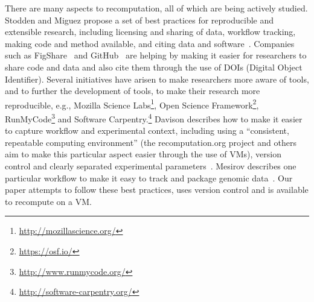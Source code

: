 There are many aspects to recomputation, all of which are being actively
studied. Stodden and Miguez propose a set of best practices for reproducible and
extensible research, including licensing and sharing of data, workflow tracking,
making code and method available, and citing data and
software~\cite{stodden:practices}. Companies such as
FigShare~\cite{figshare:citable} and GitHub~\cite{github:citable} are helping by
making it easier for researchers to share code and data and also cite them
through the use of DOIs (Digital Object Identifier). Several initiatives have
arisen to make researchers more aware of tools, and to further the development
of tools, to make their research more reproducible, e.g., Mozilla Science
Labs\footnote{\url{http://mozillascience.org/}}, Open Science
Framework\footnote{\url{https://osf.io/}},
RunMyCode\footnote{\url{http://www.runmycode.org/}} and Software
Carpentry.\footnote{\url{http://software-carpentry.org/}} Davison describes how
to make it easier to capture workflow and experimental context, including using
a ``consistent, repeatable computing environment'' (the recomputation.org
project and others~\cite{howe:reproducible} aim to make this particular aspect
easier through the use of VMs), version control and clearly
separated experimental parameters~\cite{davison:reproducibility}. Mesirov
describes one particular workflow to make it easy to track and package genomic
data~\cite{mesirov:accessible}. Our paper attempts to follow these best
practices, uses version control and is available to recompute on a VM.

%
%
